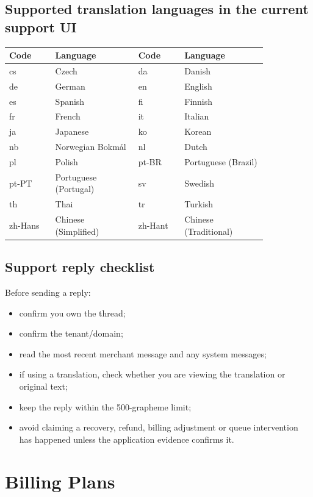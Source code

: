 \section{Supported translation languages in the current support UI}
\begin{longtable}{@{}P{0.15\linewidth}P{0.27\linewidth}P{0.15\linewidth}P{0.27\linewidth}@{}}
\toprule
\textbf{Code} & \textbf{Language} & \textbf{Code} & \textbf{Language}\\
\midrule
\endhead
cs & Czech & da & Danish\\
de & German & en & English\\
es & Spanish & fi & Finnish\\
fr & French & it & Italian\\
ja & Japanese & ko & Korean\\
nb & Norwegian Bokm\aa l & nl & Dutch\\
pl & Polish & pt-BR & Portuguese (Brazil)\\
pt-PT & Portuguese (Portugal) & sv & Swedish\\
th & Thai & tr & Turkish\\
zh-Hans & Chinese (Simplified) & zh-Hant & Chinese (Traditional)\\
\bottomrule
\end{longtable}

\section{Support reply checklist}
Before sending a reply:
\begin{itemize}
  \item confirm you own the thread;
  \item confirm the tenant/domain;
  \item read the most recent merchant message and any system messages;
  \item if using a translation, check whether you are viewing the translation or original text;
  \item keep the reply within the 500-grapheme limit;
  \item avoid claiming a recovery, refund, billing adjustment or queue intervention has happened unless the application evidence confirms it.
\end{itemize}

\chapter{Billing Plans}


